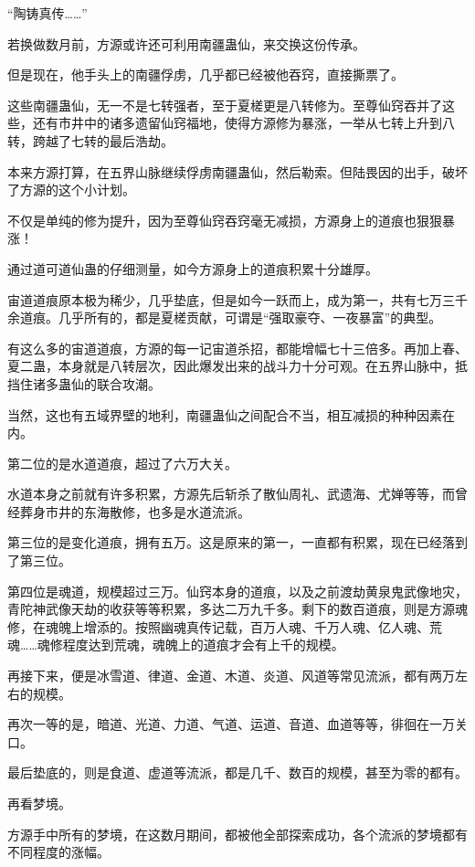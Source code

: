 
\begin{this_body}

“陶铸真传……”

若换做数月前，方源或许还可利用南疆蛊仙，来交换这份传承。

但是现在，他手头上的南疆俘虏，几乎都已经被他吞窍，直接撕票了。

这些南疆蛊仙，无一不是七转强者，至于夏槎更是八转修为。至尊仙窍吞并了这些，还有市井中的诸多遗留仙窍福地，使得方源修为暴涨，一举从七转上升到八转，跨越了七转的最后浩劫。

本来方源打算，在五界山脉继续俘虏南疆蛊仙，然后勒索。但陆畏因的出手，破坏了方源的这个小计划。

不仅是单纯的修为提升，因为至尊仙窍吞窍毫无减损，方源身上的道痕也狠狠暴涨！

通过道可道仙蛊的仔细测量，如今方源身上的道痕积累十分雄厚。

宙道道痕原本极为稀少，几乎垫底，但是如今一跃而上，成为第一，共有七万三千余道痕。几乎所有的，都是夏槎贡献，可谓是“强取豪夺、一夜暴富”的典型。

有这么多的宙道道痕，方源的每一记宙道杀招，都能增幅七十三倍多。再加上春、夏二蛊，本身就是八转层次，因此爆发出来的战斗力十分可观。在五界山脉中，抵挡住诸多蛊仙的联合攻潮。

当然，这也有五域界壁的地利，南疆蛊仙之间配合不当，相互减损的种种因素在内。

第二位的是水道道痕，超过了六万大关。

水道本身之前就有许多积累，方源先后斩杀了散仙周礼、武遗海、尤婵等等，而曾经葬身市井的东海散修，也多是水道流派。

第三位的是变化道痕，拥有五万。这是原来的第一，一直都有积累，现在已经落到了第三位。

第四位是魂道，规模超过三万。仙窍本身的道痕，以及之前渡劫黄泉鬼武像地灾，青陀神武像天劫的收获等等积累，多达二万九千多。剩下的数百道痕，则是方源魂修，在魂魄上增添的。按照幽魂真传记载，百万人魂、千万人魂、亿人魂、荒魂……魂修程度达到荒魂，魂魄上的道痕才会有上千的规模。

再接下来，便是冰雪道、律道、金道、木道、炎道、风道等常见流派，都有两万左右的规模。

再次一等的是，暗道、光道、力道、气道、运道、音道、血道等等，徘徊在一万关口。

最后垫底的，则是食道、虚道等流派，都是几千、数百的规模，甚至为零的都有。

再看梦境。

方源手中所有的梦境，在这数月期间，都被他全部探索成功，各个流派的梦境都有不同程度的涨幅。


\end{this_body}
